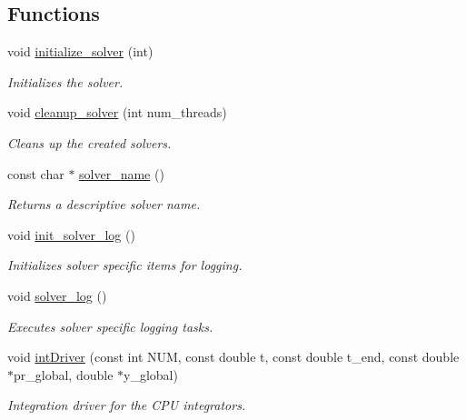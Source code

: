 \subsection*{Functions}
\begin{DoxyCompactItemize}
\item 
void \hyperlink{namespacerk78_a8edc859ecb5c707a08c7f10ead955880}{initialize\+\_\+solver} (int)
\begin{DoxyCompactList}\small\item\em Initializes the solver. \end{DoxyCompactList}\item 
void \hyperlink{namespacerk78_abb59d768a9870c26038d4e944409b1ac}{cleanup\+\_\+solver} (int num\+\_\+threads)
\begin{DoxyCompactList}\small\item\em Cleans up the created solvers. \end{DoxyCompactList}\item 
const char $\ast$ \hyperlink{namespacerk78_a71c1f52dbcd48f7915d8bff3f80963ec}{solver\+\_\+name} ()
\begin{DoxyCompactList}\small\item\em Returns a descriptive solver name. \end{DoxyCompactList}\item 
void \hyperlink{namespacerk78_a44eaccf6eb7ece7bd7c7ea9cc49eaf2a}{init\+\_\+solver\+\_\+log} ()
\begin{DoxyCompactList}\small\item\em Initializes solver specific items for logging. \end{DoxyCompactList}\item 
void \hyperlink{namespacerk78_ab0bfc30dd5d95d03d4b43730e057991b}{solver\+\_\+log} ()
\begin{DoxyCompactList}\small\item\em Executes solver specific logging tasks. \end{DoxyCompactList}\item 
void \hyperlink{namespacerk78_adc535dcbcf694d2efe1484d3a4d0d814}{int\+Driver} (const int N\+UM, const double t, const double t\+\_\+end, const double $\ast$pr\+\_\+global, double $\ast$y\+\_\+global)
\begin{DoxyCompactList}\small\item\em Integration driver for the C\+PU integrators. \end{DoxyCompactList}\end{DoxyCompactItemize}
